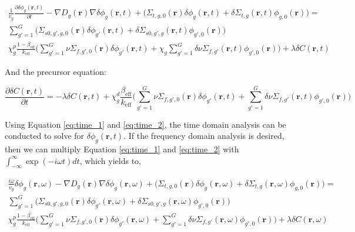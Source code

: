 \begin{equation}
        \begin{aligned}
                \frac{1}{v_g} \frac{\partial \delta \phi_g (\textbf{r}, t)}{\partial t} - \nabla D_g(\textbf{r}) \nabla \delta \phi_g(\textbf{r}, t) + \biggl(\Sigma_{t,g,0}(\textbf{r}) \delta \phi_g(\textbf{r}, t) + \delta \Sigma_{t,g}(\textbf{r}, t) \phi_{g,0}(\textbf{r}) \biggr) = \\
                \sum_{g' = 1}^{G} \biggl(\Sigma_{s0,g',g,0}(\textbf{r}) \delta \phi_{g'}(\textbf{r}, t) + \delta \Sigma_{s0,g',g}(\textbf{r}, t) \phi_{g',0}(\textbf{r}) \biggr)\\
                \chi^p_g \frac{1-\beta_{\text{eff}}}{k_{\text{eff}}} \biggl(\sum_{g' = 1}^{G} \nu \Sigma_{f,g',0}(\textbf{r}) \delta \phi_{g'}(\textbf{r}, t) + \chi_g \sum_{g' = 1}^{G} \delta \nu \Sigma_{f,g'}(\textbf{r}, t) \phi_{g',0}(\textbf{r}) \biggr) + \lambda \delta C(\textbf{r}, t)
        \end{aligned}
        \label{eq:time_1}
\end{equation}

And the precursor equation:

\begin{equation}
        \frac{\partial \delta C(\textbf{r}, t)}{\partial t} = - \lambda \delta C(\textbf{r}, t) + \chi^d_g \frac{\beta_{\text{eff}}}{k_{\text{eff}}}\biggl(\sum_{g' = 1}^{G} \nu \Sigma_{f,g',0}(\textbf{r}) \delta \phi_{g'}(\textbf{r}, t) + \sum_{g' = 1}^{G} \delta \nu \Sigma_{f,g'}(\textbf{r}, t) \phi_{g',0}(\textbf{r}) \biggr)
        \label{eq:time_2}
\end{equation}

Using Equation \ref{eq:time_1} and \ref{eq:time_2}, the time domain analysis can be conducted to solve for $\delta \phi_g (\textbf{r}, t)$. If the frequency domain analysis is desired, then we can multiply Equation \ref{eq:time_1} and \ref{eq:time_2} with $\int_{-\infty}^{\infty} \exp (-i \omega t) dt$, which yields to,

\begin{equation}
        \begin{aligned}
                \frac{i \omega}{v_g} \delta \phi_g (\textbf{r}, \omega) - \nabla D_g(\textbf{r}) \nabla \delta \phi_g(\textbf{r}, \omega) + \biggl(\Sigma_{t,g,0}(\textbf{r}) \delta \phi_g(\textbf{r}, \omega) + \delta \Sigma_{t,g}(\textbf{r}, \omega) \phi_{g,0}(\textbf{r}) \biggr) = \\
                \sum_{g' = 1}^{G} \biggl(\Sigma_{s0,g',g,0}(\textbf{r}) \delta \phi_{g'}(\textbf{r}, \omega) + \delta \Sigma_{s0,g',g}(\textbf{r}, \omega) \phi_{g',0}(\textbf{r}) \biggr)\\
                \chi^p_g \frac{1-\beta_{\text{eff}}}{k_{\text{eff}}} \biggl(\sum_{g' = 1}^{G} \nu \Sigma_{f,g',0}(\textbf{r}) \delta \phi_{g'}(\textbf{r}, \omega) + \sum_{g' = 1}^{G} \delta \nu \Sigma_{f,g'}(\textbf{r}, \omega) \phi_{g',0}(\textbf{r}) \biggr) + \lambda \delta C(\textbf{r}, \omega)
        \end{aligned}
        \label{eq:freq_1}
\end{equation}

